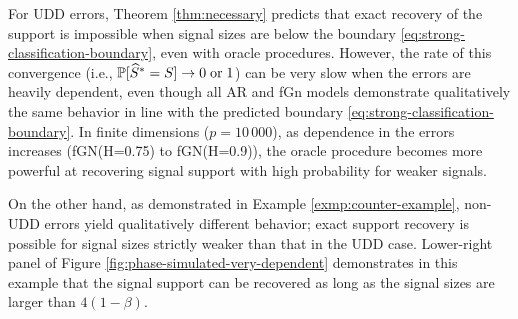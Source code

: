 For UDD errors, Theorem \ref{thm:necessary} predicts that exact recovery of the support is impossible when signal sizes are below the boundary \eqref{eq:strong-classification-boundary}, even with oracle procedures. 
However, the rate of this convergence (i.e., $\P[\widehat{S}^*=S]\to0\;\text{or}\;1$) can be very slow when the errors are heavily dependent,
even though all AR and fGn models demonstrate qualitatively the same behavior in line with the predicted boundary \eqref{eq:strong-classification-boundary}. 
In finite dimensions ($p=10\,000$), as dependence in the errors increases (fGN(H=0.75) to fGN(H=0.9)), the oracle procedure becomes more powerful at recovering signal support with high probability for weaker signals. 

On the other hand, as demonstrated in Example \ref{exmp:counter-example}, non-UDD errors yield qualitatively different behavior; exact support recovery is possible for signal sizes strictly weaker than that in the UDD case. 
Lower-right panel of Figure \ref{fig:phase-simulated-very-dependent} demonstrates in this example that the signal support can be recovered as long as the signal sizes are larger than $4(1-\beta)$.

